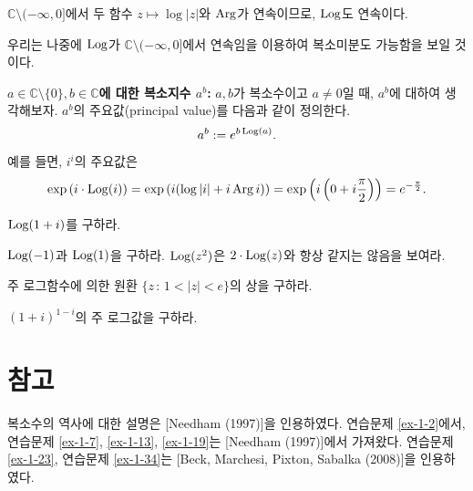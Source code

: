 $\mathbb C \setminus (-\infty,0]$에서 두 함수  $z\mapsto \log |z|$와 $\mathop{\mathrm{Arg}}$가 
연속이므로, $\mathop{\mathrm{Log}}$도 연속이다.

우리는 나중에 $\mathop{\mathrm{Log}}$가 $\mathbb C \setminus (-\infty,0]$에서 연속임을 이용하여
복소미분도 가능함을 보일 것이다.

{\bf $a\in \mathbb C\setminus \{0\}, b\in\mathbb C$에 대한 복소지수 $a^b$: }
$a,b$가 복소수이고 $a\ne0$일 때, $a^b$에 대하여 생각해보자.
$a^b$의 주요값(principal value)를 다음과 같이 정의한다.
$$
a^b := e^{b\mathop{\mathrm{Log}}(a)}.
$$
예를 들면, $i^i$의 주요값은
$$
\exp\left( i\cdot \mathop{\mathrm{Log}}(i) \right)
= \exp \left( i(\log|i| + i\mathop{\mathrm{Arg}} i) \right)
= \exp \left( i \left(0 + i\frac\pi2\right) \right) 
= e^{-\frac\pi2}.
$$

\begin{salt_exercise}\label{ex-1-40}
$\mathop{\mathrm{Log}} (1+i)$를 구하라.
\end{salt_exercise}

\begin{salt_exercise}\label{ex-1-41}
$\mathop{\mathrm{Log}}(-1)$과 $\mathop{\mathrm{Log}}(1)$을 구하라.
$\mathop{\mathrm{Log}}(z^ 2)$은 $2\cdot \mathop{\mathrm{Log}}(z)$와 항상 같지는 않음을 보여라.
\end{salt_exercise}

\begin{salt_exercise}\label{ex-1-42}
주 로그함수에 의한 원환 $\{ z\,:\, 1 < |z| <e \}$의 상을 구하라.
\end{salt_exercise}

\begin{salt_exercise}\label{ex-1-43}
$(1+i)^{1-i}$의 주 로그값을 구하라.
\end{salt_exercise}

\section{참고}
복소수의 역사에 대한 설명은 [Needham (1997)]을 인용하였다. %
연습문제 \ref{ex-1-2}\는 [Shastri (2000)]에서, 
연습문제 \ref{ex-1-7},  \ref{ex-1-13}, \ref{ex-1-19}는 [Needham (1997)]에서 가져왔다.
연습문제 \ref{ex-1-23}, 연습문제 \ref{ex-1-34}는 [Beck, Marchesi, Pixton, Sabalka (2008)]을 인용하였다.




